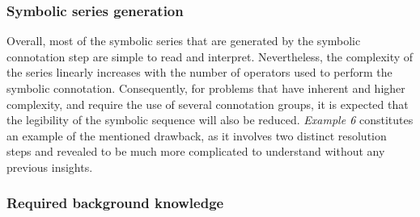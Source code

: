 \subsubsection{Symbolic series generation}
\label{sucsec:string_generation}

Overall, most of the symbolic series that are generated by the symbolic connotation step are simple to read and interpret. Nevertheless, the complexity of the series linearly increases with the number of operators used to perform the symbolic connotation. Consequently, for problems that have inherent and higher complexity, and require the use of several connotation groups, it is expected that the legibility of the symbolic sequence will also be reduced. \textit{Example 6} constitutes an example of the mentioned drawback, as it involves two distinct resolution steps and revealed to be much more complicated to understand without any previous insights.

\subsubsection{Required background knowledge}
\label{sucsec:required_knowledge}

